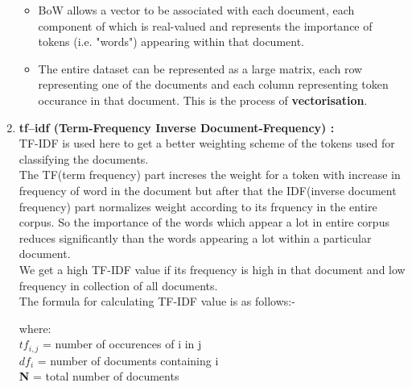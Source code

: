 \documentclass{report}
\begin{document}
\begin{multicols}{2}
\begin{enumerate}[label=\Roman*.]
\begin{itemize}
 \item BoW allows a vector to be associated with each document, each component of which is real-valued and represents the importance of tokens (i.e. "words") appearing within that document.
 \item The entire dataset can be represented as a large matrix, each row representing one of the documents and each column representing token occurance in that document. This is the process of \textbf{vectorisation}.
 \end{itemize}
 \item \textbf{tf–idf (Term-Frequency Inverse Document-Frequency) :}\\
 TF-IDF is used here to get a better weighting scheme of the tokens used for classifying the documents.\\ \linebreak The TF(term frequency) part increses the weight for a token with increase in frequency of word in the document but after that the IDF(inverse document frequency) part normalizes weight according to its frquency in the entire corpus. So the importance of the words which appear a lot in entire corpus reduces significantly than the words appearing a lot within a particular document.\\ \linebreak
We get a high TF-IDF value if its frequency is high in that document and low frequency in collection of all documents.\\ \linebreak
The formula for calculating TF-IDF value is as follows:-
\begin{center} {
\Huge \textbf {}
}
\end{center}
\Large
where:\\
\linebreak
\textbf{\Huge \(tf_{i,j} \) }= number of occurences of i in j\\ 
\linebreak
\textbf{\Huge \(df_i \)} = number of documents containing i\\
\linebreak
\textbf{\Huge N} = total number of documents\\


\end{enumerate}
\end{multicols}
\end{document}
